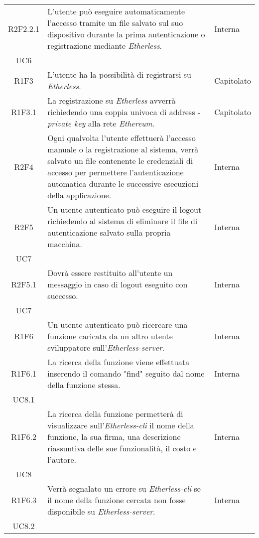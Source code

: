 \begin{longtable}{|c|p{8cm}|C{2cm}|}
	R2F2.2.1 &  L'utente può eseguire automaticamente l'accesso tramite un file salvato sul suo dispositivo durante la prima autenticazione o registrazione mediante \textit{Etherless}.  & \centering Interna \\ UC6 \tabularnewline
	
	R1F3 &  L'utente ha la possibilità di registrarsi su \textit{Etherless}.  & Capitolato \\

	R1F3.1 &  La registrazione su \textit{Etherless} avverrà richiedendo una coppia univoca di address - \textit{private key\glo} alla rete \textit{Ethereum\glos}.  & Capitolato \\	
	
	R2F4 &  Ogni qualvolta l'utente effettuerà l'accesso manuale o la registrazione al sistema, verrà salvato un file contenente le credenziali di accesso per permettere l'autenticazione automatica durante le successive esecuzioni della applicazione.  & Interna \\
	
	R2F5 &  Un utente autenticato può eseguire il logout richiedendo al sistema di eliminare il file di autenticazione salvato sulla propria macchina.  & \centering Interna \\ UC7 \tabularnewline
	
	R2F5.1 &  Dovrà essere restituito all'utente un messaggio in caso di logout eseguito con successo.  & \centering Interna \\ UC7 \tabularnewline
	
	R1F6 &  Un utente autenticato può ricercare una funzione caricata da un altro utente sviluppatore sull'\textit{Etherless-server}.  & Interna \\
	
	R1F6.1 &  La ricerca della funzione viene effettuata inserendo il comando "find" seguito dal nome della funzione stessa. & \centering Interna \\ UC8.1 \tabularnewline
	
	R1F6.2 &  La ricerca della funzione permetterà di visualizzare sull'\textit{Etherless-cli} il nome della funzione, la sua firma, una descrizione riassuntiva delle sue funzionalità, il costo e l'autore.  & \centering Interna \\ UC8 \tabularnewline
	
	R1F6.3 &  Verrà segnalato un errore su \textit{Etherless-cli} se il nome della funzione cercata non fosse disponibile su \textit{Etherless-server}.  & \centering Interna \\ UC8.2 \tabularnewline
	

\end{longtable}
